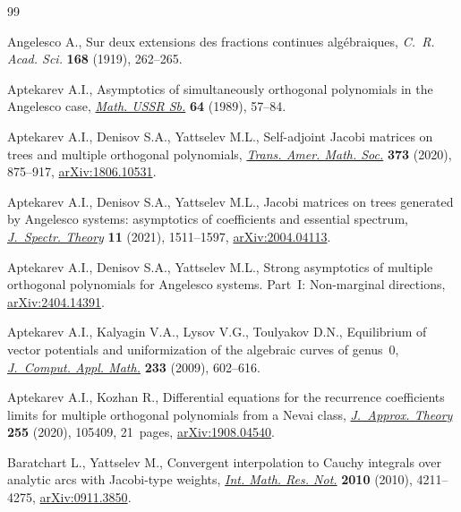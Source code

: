 \begin{thebibliography}{99}
\footnotesize\itemsep=0pt

Angelesco A., Sur deux extensions des fractions continues alg\'ebraiques,
 \textit{C.~R. Acad. Sci.} \textbf{168} (1919), 262--265.

Aptekarev A.I., Asymptotics of simultaneously orthogonal polynomials in the
 {A}ngelesco case,
 \href{https://doi.org/10.1070/SM1989v064n01ABEH003294}{\textit{Math. USSR
 Sb.}} \textbf{64} (1989), 57--84.

Aptekarev A.I., Denisov S.A., Yattselev M.L., Self-adjoint {J}acobi matrices on
 trees and multiple orthogonal polynomials,
 \href{https://doi.org/10.1090/tran/7959}{\textit{Trans. Amer. Math. Soc.}}
 \textbf{373} (2020), 875--917, \href{http://arxiv.org/abs/1806.10531}{arXiv:1806.10531}.

Aptekarev A.I., Denisov S.A., Yattselev M.L., Jacobi matrices on trees
 generated by {A}ngelesco systems: asymptotics of coefficients and essential
 spectrum, \href{https://doi.org/10.4171/jst/380}{\textit{J.~Spectr. Theory}}
 \textbf{11} (2021), 1511--1597, \href{http://arxiv.org/abs/2004.04113}{arXiv:2004.04113}.

Aptekarev A.I., Denisov S.A., Yattselev M.L., Strong asymptotics of multiple
 orthogonal polynomials for {A}ngelesco systems. {P}art~{I}: {N}on-marginal
 directions, \href{http://arxiv.org/abs/2404.14391}{arXiv:2404.14391}.
 
Aptekarev A.I., Kalyagin V.A., Lysov V.G., Toulyakov D.N., Equilibrium of
 vector potentials and uniformization of the algebraic curves of genus~0,
 \href{https://doi.org/10.1016/j.cam.2009.02.080}{\textit{J.~Comput. Appl.
 Math.}} \textbf{233} (2009), 602--616.

Aptekarev A.I., Kozhan R., Differential equations for the recurrence
 coefficients limits for multiple orthogonal polynomials from a {N}evai class,
 \href{https://doi.org/10.1016/j.jat.2020.105409}{\textit{J.~Approx. Theory}}
 \textbf{255} (2020), 105409, 21~pages, \href{http://arxiv.org/abs/1908.04540}{arXiv:1908.04540}.

Baratchart L., Yattselev M., Convergent interpolation to {C}auchy integrals
 over analytic arcs with {J}acobi-type weights,
 \href{https://doi.org/10.1093/imrn/rnq026}{\textit{Int. Math. Res. Not.}}
 \textbf{2010} (2010), 4211--4275, \href{http://arxiv.org/abs/0911.3850}{arXiv:0911.3850}.


\end{thebibliography}
